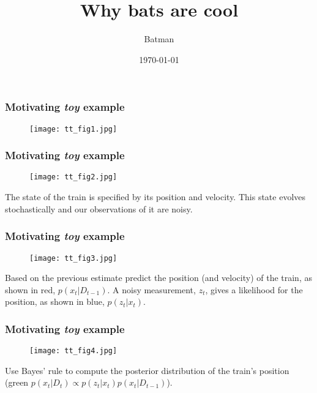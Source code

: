 \documentclass{beamer}
\title{Why bats are cool}
\author{Batman}
\date{\today}
\begin{document}
\frame{\titlepage}

%
%

\frame
{
\frametitle{Motivating \emph{toy} example}
\begin{figure}[htb]
\texttt{[image: tt\_fig1.jpg]}
\end{figure}
}
\frame
{
\frametitle{Motivating \emph{toy} example}
\begin{figure}[htb]
\texttt{[image: tt\_fig2.jpg]}
\end{figure}
The state of the train is specified by its position and velocity.
This state evolves stochastically and our observations of it are noisy.
}
\frame
{
\frametitle{Motivating \emph{toy} example}
\begin{figure}[htb]
\texttt{[image: tt\_fig3.jpg]}
\end{figure}
Based on the previous estimate predict the position (and velocity) of the train, as shown in red, {\color{red} $p(x_t|D_{t-1})$}. 
A noisy measurement, {\color{blue} $z_t$}, gives a likelihood for the position, as shown in blue, {\color{blue} $p(z_t|x_t)$}.
}
\frame
{
\frametitle{Motivating \emph{toy} example}
\begin{figure}[htb]
\texttt{[image: tt\_fig4.jpg]}
\end{figure}
Use Bayes' rule to compute the posterior distribution of the train's position (green {\color[rgb]{0,0.3,0} $p(x_t|D_t)\propto p(z_t|x_t)p(x_t|D_{t-1})$}).
}
\end{document}
